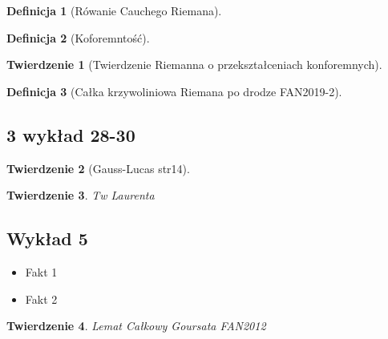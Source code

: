 \documentclass{article}
\theoremstyle{plain}
\newtheorem*{theorem}{Twierdzenie}
\theoremstyle{definition}
\newtheorem*{definition}{Definicja}
\theoremstyle{remark}
\begin{document}
\begin{definition}[Rówanie Cauchego Riemana]

\end{definition}

\begin{definition}[Koforemntość]

\end{definition}{}

\begin{theorem}[Twierdzenie Riemanna o przekształceniach konforemnych]

\end{theorem}

\begin{definition}[Całka krzywoliniowa Riemana po drodze FAN2019-2]

\end{definition}


\subsection{3 wykład 28-30}

\begin{theorem}[Gauss-Lucas str14]


\end{theorem}

\begin{definition}{Całkowanie po krzywych]

\end{definition}



\begin{theorem}{Tw Laurenta}

\end{theorem}



\subsection{Wykład 5}

\begin{itemize}
    \item Fakt 1
    \item Fakt 2
    
\end{itemize}

\begin{theorem}{Lemat Całkowy Goursata FAN2012}

\end{theorem}{}
\end{document}
